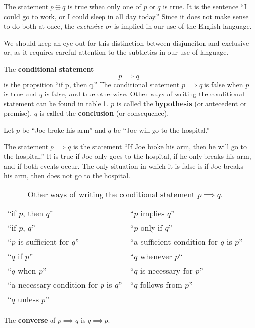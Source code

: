 \begin{defn}
\begin{ex}
    The statement $p \oplus q$ is true when only one of $p$ or $q$ is true.
    It is the sentence ``I could go to work, or I could sleep in all day today.''
    Since it does not make sense to do both at once, the \emph{exclusive or} is implied in our use of the English language.

    We should keep an eye out for this distinction between disjunciton and exclusive or, as it requires careful
    attention to the subtleties in our use of language.
  \end{ex}

  The \textbf{conditional statement} \[p \implies q\] is the propsition ``if p, then q.''
  The conditional statement \(p \implies q\) is false when \(p\) is true and \(q\) is false, and true otherwise.
  Other ways of writing the conditional statement can be found in table \ref{tab:conditionals}.
  \(p\) is called the \textbf{hypothesis} (or antecedent or premise).
  \(q\) is called the \textbf{conclusion} (or consequence).
  \begin{ex}
    Let $p$ be ``Joe broke his arm'' and $q$ be ``Joe will go to the hospital.''

    The statement $p \implies q$ is the statement ``If Joe broke his arm, then he will go to the hospital.''
    It is true if Joe only goes to the hospital, if he only breaks his arm, and if both events occur.
    The only situation in which it is false is if Joe breaks his arm, then does not go to the hospital.
  \end{ex}
  \begin{table}[H]
  \centering
    \begin{tabular}{p{2in} p{2in}}
      ``if \(p\), then \(q\)'' & ``\(p\) implies \(q\)'' \\
      ``if \(p\), \(q\)'' & ``\(p\) only if \(q\)'' \\
      ``\(p\) is sufficient for \(q\)'' & ``a sufficient condition for \(q\) is \(p\)'' \\
      ``\(q\) if \(p\)'' & ``\(q\) whenever \(p\)`` \\
      ``\(q\) when \(p\)'' & ``\(q\) is necessary for \(p\)'' \\
      ``a necessary condition for \(p\) is \(q\)'' & ``\(q\) follows from \(p\)'' \\
      ``\(q\) unless \(p\)''
    \end{tabular}
  \caption{Other ways of writing the conditional statement \(p \implies q\).}
  \label{tab:conditionals}
\end{table}
  The \textbf{converse} of \(p \implies q\) is \(q \implies p\).


\end{defn}

